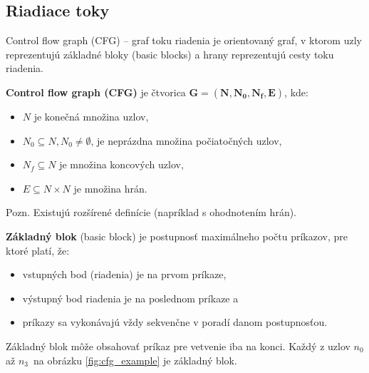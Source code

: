\subsection{Riadiace toky}
Control flow graph (CFG) -- graf toku riadenia je orientovaný graf, v ktorom uzly reprezentujú základné bloky (basic blocks) a hrany reprezentujú cesty toku riadenia.
\begin{definition}
	\textbf{Control flow graph (CFG)} je čtvorica $\mathbf{G = (N, N_0, N_f, E)}$, kde:
\begin{itemize}
	\item $N$ je konečná množina uzlov,
	\item $N_0 \subseteq N, N_0 \neq \emptyset$, je neprázdna množina počiatočných uzlov,
	\item $N_f \subseteq N$ je množina koncových uzlov,
	\item $E \subseteq N \times N$ je množina hrán.
\end{itemize}
	\label{def:cfg}
\end{definition}
Pozn. Existujú rozšírené definície (napríklad s ohodnotením hrán).

\begin{description}
	\item \textbf{Základný blok} (basic block) je postupnosť maximálneho počtu príkazov, pre ktoré platí, že: 
		\begin{itemize}
			\item vstupných bod (riadenia) je na prvom príkaze, 
			\item výstupný bod riadenia je na poslednom príkaze a 
			\item príkazy sa vykonávajú vždy sekvenčne v poradí danom postupnosťou.
		\end{itemize}
		\label{def:basic_block}
\end{description}
Základný blok môže obsahovať príkaz pre vetvenie iba na konci.
Každý z uzlov $n_0$ až $n_3$ na obrázku \ref{fig:cfg_example} je základný blok.

